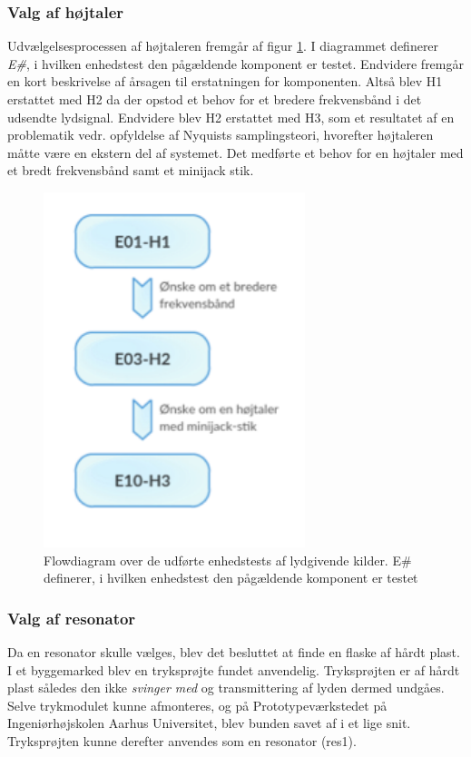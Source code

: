 \subsubsection{Valg af højtaler}
Udvælgelsesprocessen af højtaleren fremgår af figur \ref{fig:flowlyd}. I diagrammet definerer \textit{E\#}, i hvilken enhedstest den pågældende komponent er testet. Endvidere fremgår en kort beskrivelse af årsagen til erstatningen for komponenten. Altså blev H1 erstattet med H2 da der opstod et behov for et bredere frekvensbånd i det udsendte lydsignal. Endvidere blev H2 erstattet med H3, som et resultatet af en problematik vedr. opfyldelse af Nyquists samplingsteori, hvorefter højtaleren måtte være en ekstern del af systemet. Det medførte et behov for en højtaler med et bredt frekvensbånd samt et minijack stik. 

\begin{figure}[H]
\centering
\includegraphics[width=3in]{flowdiagramelyd.png}
\caption{Flowdiagram over de udførte enhedstests af lydgivende kilder. E\# definerer, i hvilken enhedstest den pågældende komponent er testet}
\label{fig:flowlyd}
\end{figure}

\subsubsection{Valg af resonator}
Da en resonator skulle vælges, blev det besluttet at finde en flaske af hårdt plast. I et byggemarked blev en tryksprøjte fundet anvendelig. Tryksprøjten er af hårdt plast således den ikke \textit{svinger med} og transmittering af lyden dermed undgåes. Selve trykmodulet kunne afmonteres, og på Prototypeværkstedet på Ingeniørhøjskolen Aarhus Universitet, blev bunden savet af i et lige snit. Tryksprøjten kunne derefter anvendes som en resonator (res1).   

